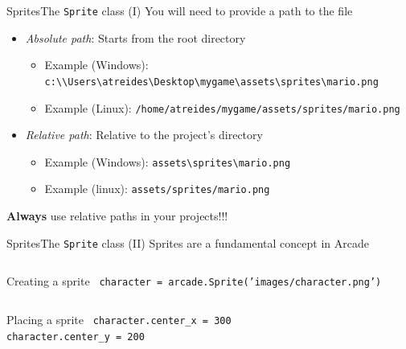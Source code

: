 \documentclass[10pt,compress]{beamer} %
\begin{document}
\begin{frame}{Sprites}{The \texttt{Sprite} class (I)}
    You will need to provide a \alert{path} to the file
    \begin{itemize}
        \item \textit{Absolute path}: Starts from the root directory
            \begin{itemize}
            \item Example (Windows): \texttt{c:\textbackslash\textbackslash Users\textbackslash atreides\textbackslash Desktop\textbackslash mygame\textbackslash assets\textbackslash sprites\textbackslash mario.png}
            \item Example (Linux): \texttt{/home/atreides/mygame/assets/sprites/mario.png}
            \end{itemize}
        \item \textit{Relative path}: Relative to the project's directory
            \begin{itemize}
            \item Example (Windows): \texttt{assets\textbackslash sprites\textbackslash mario.png}
            \item Example (linux): \texttt{assets/sprites/mario.png}
            \end{itemize}
    \end{itemize}

    \textbf{Always} use relative paths in your projects!!!
\end{frame}

\begin{frame}{Sprites}{The \texttt{Sprite} class (II)}
	Sprites are a fundamental concept in Arcade
    
    \begin{columns}
 	   \column{\textwidth}
		\begin{exampleblock}{Creating a sprite}
        \texttt{
        character = arcade.Sprite('images/character.png')
        }
		\end{exampleblock}
    \end{columns}

    \begin{columns}
		\begin{exampleblock}{Placing a sprite}
        \texttt{
        character.center\_x = 300\\
        character.center\_y = 200}
		\end{exampleblock}

    \end{columns}
\end{frame}
\end{document}
